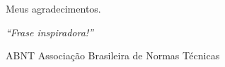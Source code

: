 \documentclass[
	12pt,				%
	openright,			%
	twoside,			%
	a4paper,			%
    french,             %
	spanish,			%
	english,			%
	brazil				%
	]{abntex2}
\begin{document}
\begin{agradecimentos}
	Meus agradecimentos.

\end{agradecimentos}

\begin{epigrafe}
	\vspace*{\fill}
	\begin{flushright}
		\textit{``Frase inspiradora!''}
	\end{flushright}
\end{epigrafe}






\listoffigures*
\cleardoublepage

\listoftables*
\cleardoublepage

\begin{siglas}
	\item[ABNT] Associação Brasileira de Normas Técnicas
\end{siglas}


\tableofcontents*
\cleardoublepage

\textual




\end{document}

